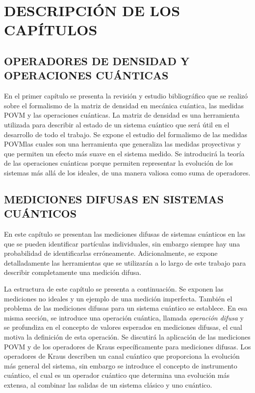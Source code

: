 \documentclass[12pt,oneside]{book}\raggedbottom{} %
\begin{document}
\begin{sloppypar}
{{%
\chapter{DESCRIPCIÓN DE LOS CAPÍTULOS}  %
\section{OPERADORES DE DENSIDAD Y OPERACIONES CUÁNTICAS}
En el primer capítulo  se presenta la revisión y estudio bibliográfico que se
realizó sobre el formalismo de la matriz de densidad en mecánica cuántica, las
medidas POVM y las operaciones cuánticas. La matriz de densidad es una
herramienta utilizada para describir al estado de un sistema cuántico que será
útil en el desarrollo de todo el trabajo.  Se expone el estudio del formalismo
de las medidas POVM\@ las cuales son una herramienta que generaliza las medidas
proyectivas y que permiten un efecto más suave en el sistema medido.  Se
introducirá la teoría de las operaciones cuánticas  porque permiten representar
la evolución de los sistemas más allá de los ideales, de una manera valiosa
como suma de operadores.

\section{MEDICIONES DIFUSAS EN SISTEMAS CUÁNTICOS}
En este capítulo se presentan las mediciones difusas de sistemas cuánticos en las que se pueden identificar partículas individuales, sin embargo siempre hay una probabilidad de identificarlas erróneamente.  Adicionalmente, se expone detalladamente las herramientas que se utilizarán a lo largo de este trabajo para describir completamente una medición difusa.

La estructura de este capítulo se presenta a continuación. Se exponen las mediciones no ideales y un ejemplo de una medición imperfecta. También el problema de las mediciones difusas para un sistema cuántico se establece. En esa misma sección, se introduce una operación cuántica, llamada \textit{operación difusa} y se profundiza en el concepto de valores esperados en mediciones difusas, el cual motiva la definición de esta operación. Se discutirá la aplicación de las mediciones POVM y de los operadores de Kraus específicamente para mediciones difusas. Los operadores de Kraus describen un canal cuántico que proporciona la evolución más general del sistema, sin embargo se introduce el concepto de instrumento cuántico, el cual es un operador cuántico que determina una evolución más extensa, al combinar las salidas de un sistema clásico y uno cuántico.



}}
\end{sloppypar}
\end{document}

